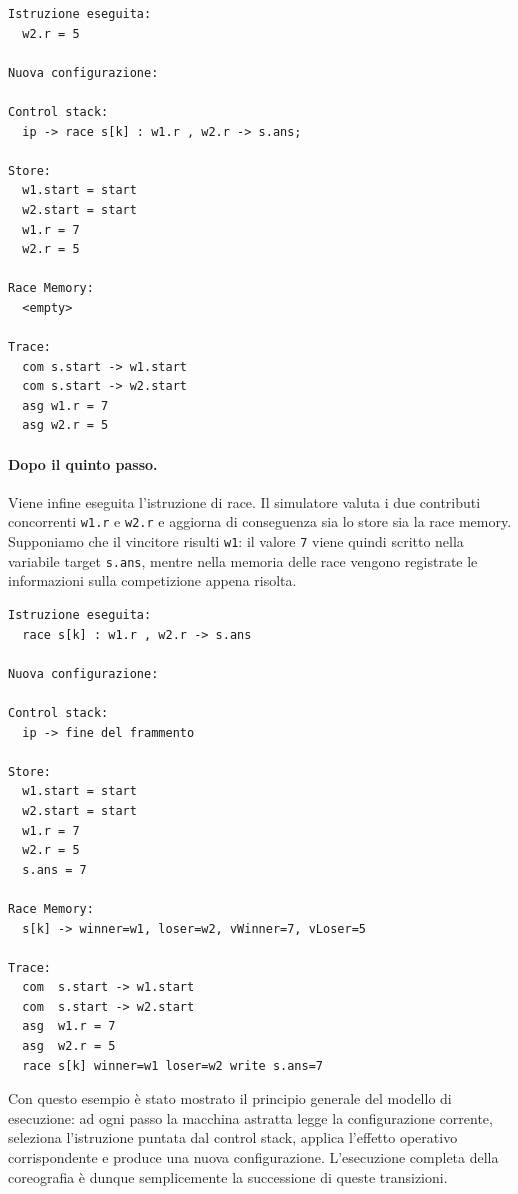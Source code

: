 \begin{tcolorbox}[colback=black!2,colframe=black!35,boxrule=0.4pt,height=0.65\textheight]
\begin{verbatim}
Istruzione eseguita:
  w2.r = 5

Nuova configurazione:

Control stack:
  ip -> race s[k] : w1.r , w2.r -> s.ans;

Store:
  w1.start = start
  w2.start = start
  w1.r = 7
  w2.r = 5

Race Memory:
  <empty>

Trace:
  com s.start -> w1.start
  com s.start -> w2.start
  asg w1.r = 7
  asg w2.r = 5
\end{verbatim}
\end{tcolorbox}

\clearpage

\paragraph{Dopo il quinto passo.}
Viene infine eseguita l’istruzione di race. Il simulatore valuta i due contributi concorrenti \texttt{w1.r} e \texttt{w2.r} e aggiorna di conseguenza sia lo store sia la race memory. Supponiamo che il vincitore risulti \texttt{w1}: il valore \texttt{7} viene quindi scritto nella variabile target \texttt{s.ans}, mentre nella memoria delle race vengono registrate le informazioni sulla competizione appena risolta.

\begin{tcolorbox}[colback=black!2,colframe=black!35,boxrule=0.4pt,height=0.65\textheight]
\begin{verbatim}
Istruzione eseguita:
  race s[k] : w1.r , w2.r -> s.ans

Nuova configurazione:

Control stack:
  ip -> fine del frammento

Store:
  w1.start = start
  w2.start = start
  w1.r = 7
  w2.r = 5
  s.ans = 7

Race Memory:
  s[k] -> winner=w1, loser=w2, vWinner=7, vLoser=5

Trace:
  com  s.start -> w1.start
  com  s.start -> w2.start
  asg  w1.r = 7
  asg  w2.r = 5
  race s[k] winner=w1 loser=w2 write s.ans=7
\end{verbatim}
\end{tcolorbox}

Con questo esempio è stato mostrato il principio generale del modello di esecuzione: ad ogni passo la macchina astratta legge la configurazione corrente, seleziona l’istruzione puntata dal control stack, applica l’effetto operativo corrispondente e produce una nuova configurazione. L’esecuzione completa della coreografia è dunque semplicemente la successione di queste transizioni.

